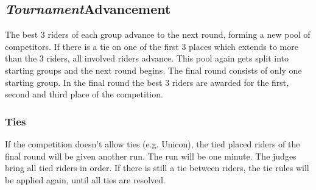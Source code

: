 \subsection{\textit{Tournament}\textbf{Advancement}}
The best 3 riders of each group advance to the next round, forming a new pool of competitors.
If there is a tie on one of the first 3 places which extends to more than the 3 riders, all involved riders advance.
This pool again gets split into starting groups and the next round begins.
The final round consists of only one starting group.
In the final round the best 3 riders are awarded for the first, second and third place of the competition.

\subsubsection{Ties}
If the competition doesn't allow ties (e.g. Unicon), the tied placed riders of the final round will be given another run.
The run will be one minute.
The judges bring all tied riders in order.
If there is still a tie between riders, the tie rules will be applied again, until all ties are resolved.
